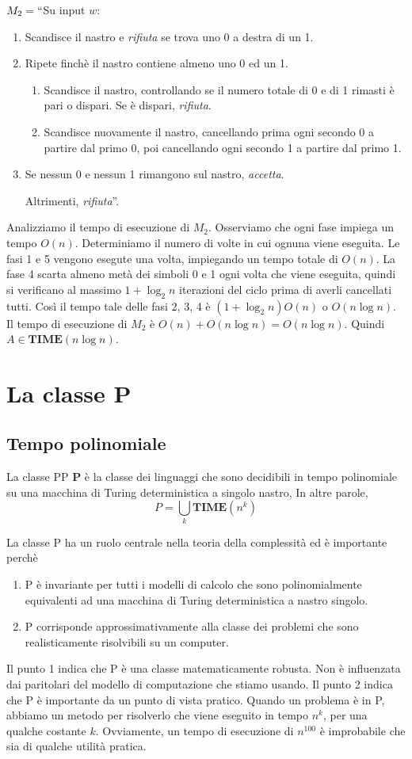 \documentclass[12pt]{report}
\newcounter{definition}
\newcommand{\nmu}{}
\begin{document}
$M_2 = ``$Su input $w$:
\begin{enumerate}
	\item Scandisce il nastro e \textit{rifiuta} se trova uno 0 a destra di un 1.
	\item Ripete finchè il nastro contiene almeno uno 0 ed un 1.
	\begin{enumerate}
		\item Scandisce il nastro, controllando se il numero totale di 0 e di 1 rimasti è pari o dispari. Se è dispari, \textit{rifiuta}.
		\item Scandisce nuovamente il nastro, cancellando prima ogni secondo 0 a partire dal primo 0, poi cancellando ogni secondo 1 a partire dal primo 1.
	\end{enumerate}
	\item Se nessun 0 e nessun 1 rimangono sul nastro, \textit{accetta}.

	Altrimenti, \textit{rifiuta}''.
\end{enumerate}
Analizziamo il tempo di esecuzione di $M_2$. Osserviamo che ogni fase impiega un tempo $O(n)$. Determiniamo il numero di volte in cui ognuna viene eseguita. Le fasi 1 e 5 vengono esegute una volta, impiegando un tempo totale di $O(n)$. La fase 4 scarta almeno metà dei simboli 0 e 1 ogni volta che viene eseguita, quindi si verificano al massimo $1 + \log_2{n}$ iterazioni del ciclo prima di averli cancellati tutti. Così il tempo tale delle fasi 2, 3, 4 è $(1 + \log_2{n})O(n)$ o $O(n\log n)$. Il tempo di esecuzione di $M_2$ è $O(n) + O(n\log n) = O(n \log n)$. Quindi $A \in \mathbf{TIME}(n\log n)$.
\section{La classe P}
\subsection{Tempo polinomiale}
\begin{definition}{\nmu La classe P}{P}
	$\mathbf{P}$ è la classe dei linguaggi che sono decidibili in tempo polinomiale su una macchina di Turing deterministica a singolo nastro, In altre parole,
	\[
	P = \bigcup_{k}\mathbf{TIME}\left(n^k\right)
	\]
\end{definition}
La classe P ha un ruolo centrale nella teoria della complessità ed è importante perchè
\begin{enumerate}
	\item P è invariante per tutti i modelli di calcolo che sono polinomialmente equivalenti ad una macchina di Turing deterministica a nastro singolo.
	\item P corrisponde approssimativamente alla classe dei problemi che sono realisticamente risolvibili su un computer.
\end{enumerate}
Il punto 1 indica che P è una classe matematicamente robusta. Non è influenzata dai paritolari del modello di computazione che stiamo usando. Il punto 2 indica che P è importante da un punto di vista pratico. Quando un problema è in P, abbiamo un metodo per risolverlo che viene eseguito in tempo $n^k$, per una qualche costante $k$. Ovviamente, un tempo di esecuzione di $n^{100}$ è improbabile che sia di qualche utilità pratica.
\end{document}
